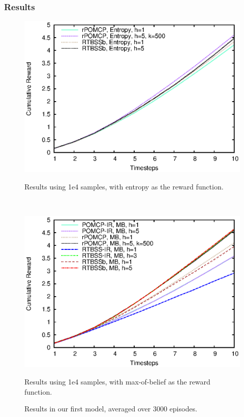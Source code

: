\documentclass[xcolor={dvipsnames}]{beamer}
\begin{document}
\begin{frame}
\frametitle{Results}
\begin{figure}[ht!]
        \centering
        \begin{minipage}[t]{0.45\textwidth}
                \includegraphics[width=\textwidth]{../images/Images/MyoResults/1e4/E/output}
                \caption{Results using 1e4 samples, with entropy as the reward function.}
                \label{fig:m4e}
        \end{minipage}%
        ~ %
        \begin{minipage}[t]{0.45\textwidth}
                \includegraphics[width=\textwidth]{../images/Images/MyoResults/1e4/MB/output}
                \caption{Results using 1e4 samples, with max-of-belief as the reward function.}
                \label{fig:m5e}
        \end{minipage}
        \caption{Results in our first model, averaged over 3000 episodes.}
        \label{ref:myoentropyfig}
\end{figure}
\end{frame}
\end{document}
